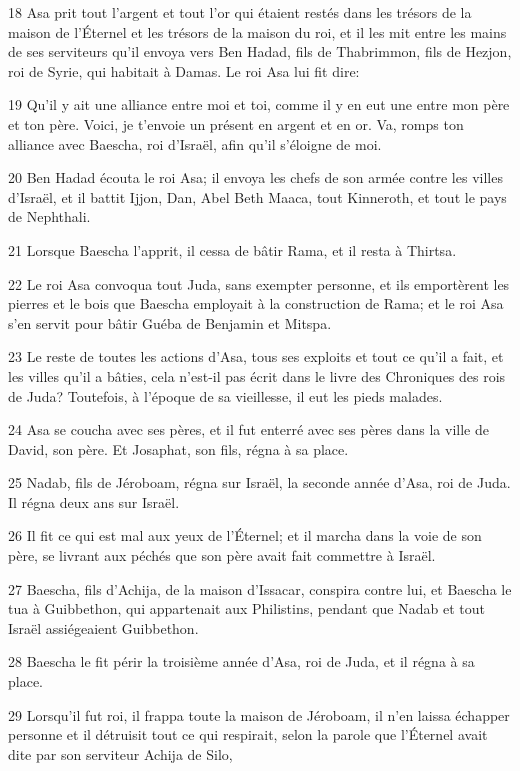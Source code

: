 \par 18 Asa prit tout l'argent et tout l'or qui étaient restés dans les trésors de la maison de l'Éternel et les trésors de la maison du roi, et il les mit entre les mains de ses serviteurs qu'il envoya vers Ben Hadad, fils de Thabrimmon, fils de Hezjon, roi de Syrie, qui habitait à Damas. Le roi Asa lui fit dire:
\par 19 Qu'il y ait une alliance entre moi et toi, comme il y en eut une entre mon père et ton père. Voici, je t'envoie un présent en argent et en or. Va, romps ton alliance avec Baescha, roi d'Israël, afin qu'il s'éloigne de moi.
\par 20 Ben Hadad écouta le roi Asa; il envoya les chefs de son armée contre les villes d'Israël, et il battit Ijjon, Dan, Abel Beth Maaca, tout Kinneroth, et tout le pays de Nephthali.
\par 21 Lorsque Baescha l'apprit, il cessa de bâtir Rama, et il resta à Thirtsa.
\par 22 Le roi Asa convoqua tout Juda, sans exempter personne, et ils emportèrent les pierres et le bois que Baescha employait à la construction de Rama; et le roi Asa s'en servit pour bâtir Guéba de Benjamin et Mitspa.
\par 23 Le reste de toutes les actions d'Asa, tous ses exploits et tout ce qu'il a fait, et les villes qu'il a bâties, cela n'est-il pas écrit dans le livre des Chroniques des rois de Juda? Toutefois, à l'époque de sa vieillesse, il eut les pieds malades.
\par 24 Asa se coucha avec ses pères, et il fut enterré avec ses pères dans la ville de David, son père. Et Josaphat, son fils, régna à sa place.
\par 25 Nadab, fils de Jéroboam, régna sur Israël, la seconde année d'Asa, roi de Juda. Il régna deux ans sur Israël.
\par 26 Il fit ce qui est mal aux yeux de l'Éternel; et il marcha dans la voie de son père, se livrant aux péchés que son père avait fait commettre à Israël.
\par 27 Baescha, fils d'Achija, de la maison d'Issacar, conspira contre lui, et Baescha le tua à Guibbethon, qui appartenait aux Philistins, pendant que Nadab et tout Israël assiégeaient Guibbethon.
\par 28 Baescha le fit périr la troisième année d'Asa, roi de Juda, et il régna à sa place.
\par 29 Lorsqu'il fut roi, il frappa toute la maison de Jéroboam, il n'en laissa échapper personne et il détruisit tout ce qui respirait, selon la parole que l'Éternel avait dite par son serviteur Achija de Silo,
